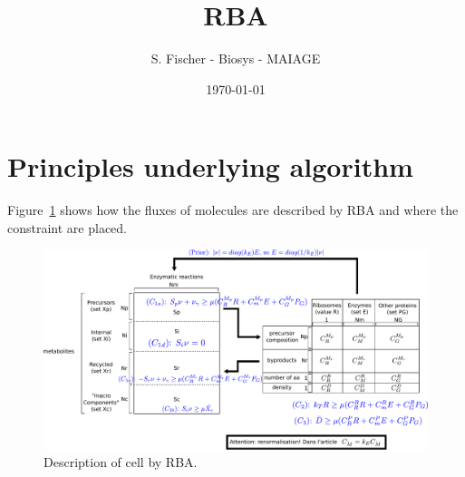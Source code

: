\documentclass[12pt]{scrartcl}
\newcommand\reft[3][]{#2~\ref{#3}#1}
\theoremstyle{definition}
\theoremstyle{remark}
\numberwithin{equation}{section}
\newcommand\reffigt[2][]{\reft[#1]{Figure}{#2}}
\begin{document}
\title{RBA}%
\author{S. Fischer - Biosys - MAIAGE}%
\date{\today}%

\maketitle

\newpage

\tableofcontents

\newpage

\section{Principles underlying algorithm}

\reffigt{fig:rba} shows how the fluxes of molecules are described by RBA and where the constraint are placed.

\begin{figure}[ht]
  \centering
  \includegraphics[width=\linewidth]{RBA}
  \caption{Description of cell by RBA.}
  \label{fig:rba}
\end{figure}


\clearpage

\clearpage


\newpage

\appendix


%
%
\end{document}
